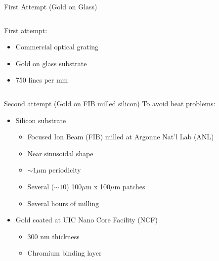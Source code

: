 \begin{frame}{First Attempt (Gold on Glass)}
  \begin{columns}
    \begin{column}{0.49\linewidth}
      First attempt:
      \begin{itemize}
        \item Commercial optical grating
        \item Gold on glass substrate
        \item 750 lines per mm
      \end{itemize}
    \end{column}
    \begin{column}{0.49\linewidth}
      \begin{figure}
        \centering
      \end{figure}
    \end{column}
  \end{columns}
\end{frame}

\begin{frame}{Second attempt (Gold on FIB milled silicon)}
  To avoid heat problems:
  \begin{itemize}
    \item Silicon substrate
    \begin{itemize}
      \item Focused Ion Beam (FIB) milled at Argonne Nat'l Lab (ANL)
      \item Near sinusoidal shape
      \item $\sim 1 \mu$m periodicity
      \item Several ($\sim10$) 100$\mu$m x 100$\mu$m patches
      \item Several hours of milling
    \end{itemize}
    \item Gold coated at UIC Nano Core Facility (NCF)
    \begin{itemize}
      \item 300 nm thickness
      \item Chromium binding layer
    \end{itemize}
  \end{itemize}
  
\end{frame}

